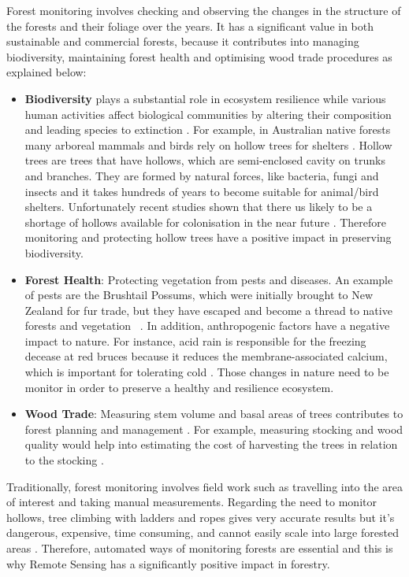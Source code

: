 \documentclass{subfiles}
\begin{document}
Forest monitoring {\color{blue} involves checking and observing the changes in the structure of the forests and their foliage over the years. It has a significant value in both sustainable and commercial forests, because it contributes} into managing biodiversity, maintaining forest health and optimising wood trade procedures as explained below: 
\begin{itemize}
 \item \textbf{Biodiversity} plays a substantial role in ecosystem resilience \cite{Elmqvist2003} while various human activities affect biological communities by altering their composition and leading species to extinction \cite{Hooper2005}.  For example, in Australian native forests many arboreal mammals and birds rely on hollow trees for shelters \cite{Lindenmayer2010} {\color{blue}. Hollow trees are trees that have hollows, which are semi-enclosed cavity on trunks and branches. They are formed by natural forces, like bacteria, fungi and insects and it takes hundreds of years to become suitable for animal/bird shelters. Unfortunately recent studies shown that there us likely to be a shortage of hollows available for colonisation in the near future \cite{Goldingay2009}\cite{Gibbons2002}}. Therefore monitoring  and protecting hollow trees have a positive impact in preserving biodiversity.
 
 \item \textbf{Forest Health}: Protecting vegetation from pests and diseases. An example of pests are the Brushtail Possums, which were initially brought to New Zealand for fur trade, but they have escaped and become a thread to native forests and vegetation ~\cite{DepartementOfConversation2014}. In addition, anthropogenic factors have a negative impact to nature. For instance, acid rain is responsible for the freezing decease at red bruces because it reduces the membrane-associated calcium, which is important for tolerating cold 
 \cite{DeHayes1999}. Those changes in nature need to be monitor in order to preserve a healthy and resilience ecosystem. 

 
 \item \textbf{Wood Trade}:  Measuring stem volume and basal areas of trees contributes to forest planning and management \cite{Holmgren2004}. For example, measuring stocking and wood quality would help into estimating the cost of harvesting the trees in relation to the stocking \cite{Susana2015}.
 
\end{itemize}
 
{\color{blue}Traditionally, forest monitoring involves field work such as travelling into the area of interest and taking manual measurements. Regarding the need to monitor hollows}, tree climbing with ladders and ropes gives very accurate results but it's dangerous, expensive, time consuming, and cannot easily scale into large forested areas \cite{Harper2004}\cite{Rayner2011}. Therefore, automated ways of monitoring forests are essential and this is why Remote Sensing has a significantly positive impact in forestry. 
 
\end{document}
